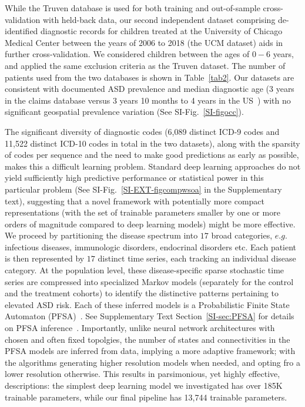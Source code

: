 \documentclass[onecolumn,10pt]{IEEEtran}
\begin{document}
While the Truven database is used for both training and out-of-sample cross-validation with held-back  data, our second independent dataset  comprising de-identified diagnostic records for children treated at the University of Chicago Medical Center between the years of 2006 to 2018 (the UCM dataset) aids in further cross-validation. We considered children between the ages of $0-6$ years, and  applied the same exclusion criteria as the Truven dataset.  The  number of  patients used from the two databases is shown in Table~\ref{tab2}. Our datasets are consistent with documented ASD prevalence and median diagnostic age (3 years in the claims database  versus 3 years 10 months to 4 years  in the US~\cite{pmid29701730}) with no significant geospatial prevalence variation (See SI-Fig.~\ref{SI-figocc}).

The significant diversity of diagnostic codes (6,089 distinct ICD-9 codes and 11,522 distinct ICD-10 codes in total in the two datasets), along with the sparsity of codes per sequence and the need to make good predictions as early as possible,  makes this a difficult learning problem. {\HCOL Standard deep learning approaches do not yield sufficiently high predictive performance or statistical power in this particular problem (See SI-Fig.~\ref{SI-EXT-figcompwsoa} in the Supplementary text), suggesting that a novel framework  with potentially more  compact representations (with the set of trainable parameters smaller by one or more orders of magnitude compared to deep learning models) might be more effective.} We proceed by  partitioning the  disease spectrum into $17 $ broad categories, $e.g.$ infectious diseases, immunologic disorders, endocrinal disorders etc. Each patient is then represented by $17$ distinct time series, each  tracking an individual disease category. At the population level, these disease-specific sparse stochastic time series are  compressed into specialized Markov models (separately for the control and the treatment cohorts) to identify  the distinctive patterns  pertaining to elevated ASD risk. Each of these inferred models is a Probabilistic Finite State Automaton (PFSA)~\cite{CR08}. See Supplementary Text Section~\ref{SI-sec:PFSA} for details on PFSA inference~\cite{CL12g,Chattopadhyay20140826}.  {\HCOL Importantly, unlike neural network architectures with chosen and often fixed topolgies, the number of states and connectivities in the PFSA models are inferred from data, implying a more adaptive framework; with the algorithms generating higher resolution models when needed, and opting fro a lower resolution otherwise. This results in  parsimonious, yet highly effective,  descriptions: the simplest deep learning model we investigated has over 185K trainable parameters, while our final pipeline has 13,744 trainable parameters.}
\end{document}
